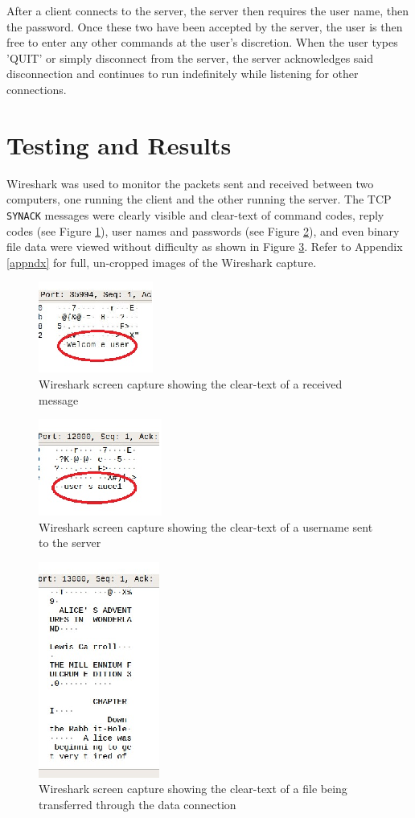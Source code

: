 \documentclass[journal, a4paper]{IEEEtran}
\begin{document}
After a client connects to the server, the server then requires the user name, then the password. Once these two have been accepted by the server, the user is then free to enter any other commands at the user's discretion. When the user types 'QUIT' or simply disconnect from the server, the server acknowledges said disconnection and continues to run indefinitely while listening for other connections.


\section{Testing and Results}
Wireshark was used to monitor the packets sent and received between two computers, one running the client and the other running the server. The TCP \texttt{SYNACK} messages were clearly visible and clear-text of command codes, reply codes (see Figure \ref{wirecodes}), user names and passwords (see Figure \ref{wirenames}), and even binary file data were viewed without difficulty as shown in Figure \ref{wiredata}. Refer to Appendix \ref{appndx} for full, un-cropped images of the Wireshark capture.
\begin{figure}[hbtp!]
	\centering
	\includegraphics[scale = 3.0]{wirecodes}
	\caption{Wireshark screen capture showing the clear-text of a received message}
	\label{wirecodes}
\end{figure}
\begin{figure}[hbtp!]
	\centering
	\includegraphics[scale = 3.0]{wirenames}
	\caption{Wireshark screen capture showing the clear-text of a username sent to the server}
	\label{wirenames}
\end{figure}
\begin{figure}[hbtp!]
	\centering
	\includegraphics[scale = 2.0]{wiredata}
	\caption{Wireshark screen capture showing the clear-text of a file being transferred through the data connection}
	\label{wiredata}
\end{figure}
\end{document}
